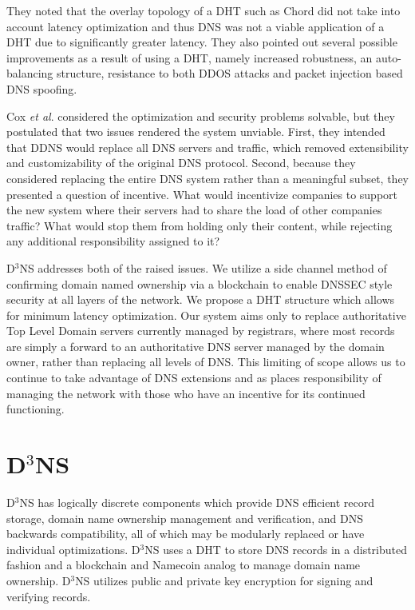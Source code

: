 They noted that the overlay topology of a DHT such as Chord did not take into account latency optimization and thus DNS was not a viable application of a DHT due to significantly greater latency. They also pointed out several possible improvements as a result of using a DHT, namely increased robustness, an auto-balancing structure, resistance to both DDOS attacks and packet injection based DNS spoofing.


Cox \textit{et al}. considered the optimization and security problems solvable, but they postulated that two issues rendered the system unviable. First, they intended that DDNS would replace all DNS servers and traffic, which removed extensibility and customizability of the original DNS protocol. Second, because they considered replacing the entire DNS system rather than a meaningful subset, they presented a question of incentive. What would incentivize companies to support the new system where their servers had to share the load of other companies traffic?  What would stop them from holding only their content, while rejecting any additional responsibility assigned to it?


D$^3$NS addresses both of the raised issues. 
We utilize a side channel method of confirming domain named ownership via a blockchain \cite{namecoin} to enable DNSSEC style security at all layers of the network. 
We propose a DHT structure which allows for minimum latency optimization. 
Our system aims only to replace authoritative Top Level Domain servers currently managed by registrars, where most records are simply a forward to an authoritative DNS server managed by the domain owner, rather than replacing all levels of DNS. 
This limiting of scope allows us to continue to take advantage of DNS extensions and as places responsibility of managing the network with those who have an incentive for its continued functioning.



\section{D$^{3}$NS}
D$^{3}$NS has logically discrete components which provide DNS efficient record storage, domain name ownership management and verification, and DNS backwards compatibility, all of which may be modularly replaced or have individual optimizations. 
D$^{3}$NS uses a DHT to store DNS records in a distributed fashion and a blockchain and Namecoin \cite{namecoin} analog to manage domain name ownership.  
D$^{3}$NS utilizes public and private key encryption for signing and verifying records.


